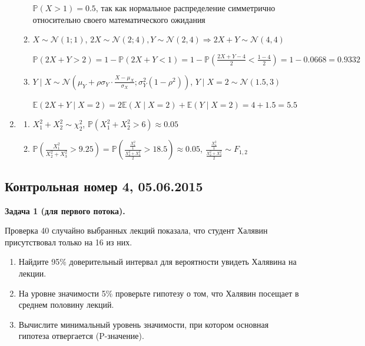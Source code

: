 \documentclass[12pt, a4paper]{article}\usepackage[]{graphicx}\usepackage[]{color}
\begin{document}
\begin{enumerate}
\begin{enumerate}
			$\mathbb{P}(X>1) = 0.5$, так как нормальное распределение симметрично относительно своего математического ожидания

			\item $X \sim \mathcal{N} (1;1)$, $2X \sim \mathcal{N}(2; 4), Y \sim \mathcal{N}(2, 4) \Rightarrow 2X+Y \sim \mathcal{N} (4, 4)$

			$\mathbb{P}(2X+Y > 2) = 1 - \mathbb{P}(2X+Y < 1) = 1 - \mathbb{P}\left(\frac{2X+Y - 4}{2} < \frac{1-4}{2}\right) = 1 - 0.0668 = 0.9332$

			\item $Y \mid X \sim \mathcal{N}\left(\mu_Y + \rho\sigma_Y\cdot\frac{X-\mu_X}{\sigma_X}; \sigma_Y^2(1-\rho^2)\right)$, $Y \mid X=2 \sim \mathcal{N}(1.5, 3)$

			$\mathbb{E}(2X+Y \mid X=2) = 2\mathbb{E} (X\mid X=2) + \mathbb{E}(Y\mid X=2) = 4 + 1.5 = 5.5$
		\end{enumerate}

	\item
		\begin{enumerate}
			\item $X_1^2 + X_2^2 \sim \chi^2_2$, $\mathbb{P}(X_1^2 + X_2^2 > 6)  \approx 0.05$
			\item $\mathbb{P}\left(\frac{X_1^2}{X_2^2+X_3^2} > 9.25\right) = \mathbb{P}\left(\frac{\frac{X_1^2}{1}}{\frac{X_2^2+X_3^2}{2}} > 18.5\right) \approx 0.05$, $\frac{\frac{X_1^2}{1}}{\frac{X_2^2+X_3^2}{2}} \sim F_{1, 2}$
		\end{enumerate}
\end{enumerate}

\subsection{Контрольная номер 4, 05.06.2015}


\textbf{Задача 1 (для первого потока).}

Проверка  40 случайно выбранных лекций показала, что студент Халявин присутствовал только на 16 из них.
\begin{enumerate}
\item Найдите 95\% доверительный интервал для вероятности увидеть Халявина на лекции.
\item На уровне значимости 5\% проверьте гипотезу о том, что Халявин посещает в среднем половину лекций.
\item Вычислите минимальный уровень значимости, при котором основная гипотеза отвергается (P-значение).
\end{enumerate}
\end{document}
